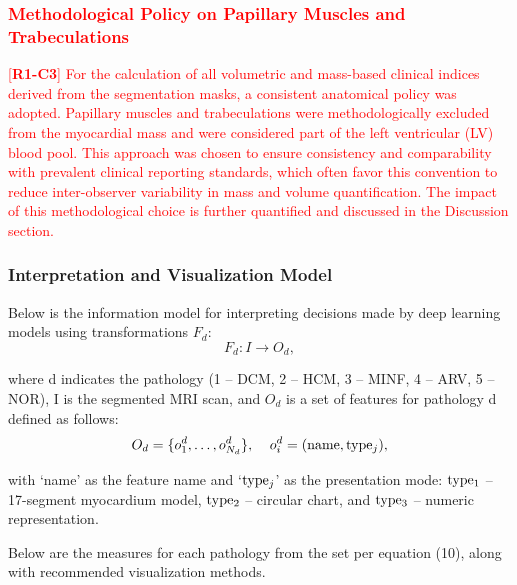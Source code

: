\documentclass[fleqn,10pt]{wlscirep}
\newcommand{\revtag}[2]{[\textbf{R#1-C#2}]}
\newcommand{\Rone}[1]{\textcolor{red}{#1}}
\begin{document}
\Rone{\subsubsection*{Methodological Policy on Papillary Muscles and Trabeculations}}
\Rone{\revtag{1}{3} For the calculation of all volumetric and mass-based clinical indices derived from the segmentation masks, a consistent anatomical policy was adopted. Papillary muscles and trabeculations were methodologically excluded from the myocardial mass and were considered part of the left ventricular (LV) blood pool. This approach was chosen to ensure consistency and comparability with prevalent clinical reporting standards, which often favor this convention to reduce inter-observer variability in mass and volume quantification. The impact of this methodological choice is further quantified and discussed in the Discussion section.}

\subsubsection*{Interpretation and Visualization Model}

Below is the information model for interpreting decisions made by deep learning models using transformations \({F_d}\):
\begin{equation}
    {F_d}:I \to {O_d},
\end{equation}

where d indicates the pathology (1 -- DCM, 2 -- HCM, 3 -- MINF, 4 -- ARV, 5 -- NOR), I is the segmented MRI scan, and \({O_d}\) is a set of features for pathology d defined as follows:
\begin{equation}
    {O_d} = \{ o_1^d, \ldots ,o_{{N_d}}^d\} ,\quad {\kern 1pt} o_i^d = ({\rm{name}},{\rm{typ}}{{\rm{e}}_j}),
\end{equation}

with `name' as the feature name and `\({\rm{typ}}{{\rm{e}}_j}\)' as the presentation mode: \({\rm{typ}}{{\rm{e}}_1}\) -- 17-segment myocardium model, \({\rm{typ}}{{\rm{e}}_2}\) -- circular chart, and \({\rm{typ}}{{\rm{e}}_3}\) -- numeric representation.

Below are the measures for each pathology from the set per equation (10), along with recommended visualization methods.
\end{document}
